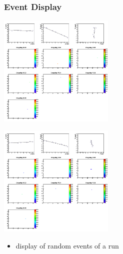 \documentclass[9pt]{beamer}
\begin{document}
\begin{frame}
	\frametitle{Event Display}
	\begin{center}
		\begin{minipage}{5.5cm}
			\centering
			\includegraphics[width=5.5cm]{Pics/Tracks_Ev2}
		\end{minipage}
		\hspace*{2pt}
		\begin{minipage}{5.5cm}
			\centering
			\includegraphics[width=5.5cm]{Pics/Tracks_Ev7}
		\end{minipage}\no\s
		\begin{itemize}
		\item display of random events of a run
	\end{itemize}
	\end{center}
\end{frame}
\end{document}
